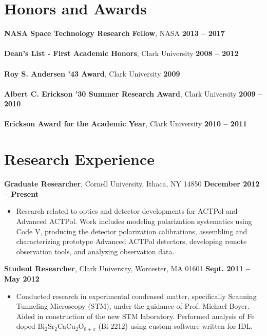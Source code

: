 \documentclass[margin,line]{res}
\begin{document}
\begin{resume}
\section{\sc Honors and Awards}  %
\textbf{NASA Space Technology Research Fellow}, NASA \hfill \textbf{2013 -- 2017}\\
\\
\textbf{Dean's List - First Academic Honors}, Clark University \hfill \textbf{2008 -- 2012}\\ 
\\
\textbf{Roy S. Andersen '43 Award}, Clark University \hfill \textbf{2009}\\ 
\\
\textbf{Albert C. Erickson '30 Summer Research Award}, Clark University \hfill \textbf{2009 -- 2010}\\ 
\\
\textbf{Erickson Award for the Academic Year}, Clark University \hfill \textbf{2010 -- 2011}\\ 

\section{\sc Research Experience}      
    \textbf{Graduate Researcher}, Cornell University, Ithaca, NY 14850 \hfill \textbf{December 2012 -- Present}
    \vspace*{1mm}
    \begin{itemize}
        \item [ ] Research related to optics and detector developments for ACTPol and
                  Advanced ACTPol. Work includes modeling polarization
                  systematics using Code V, producing the detector polarization calibrations,
                  assembling and characterizing prototype Advanced ACTPol detectors, developing remote
                  observation tools, and analyzing observation data.
    \end{itemize} 

    \textbf{Student Researcher}, Clark University, Worcester, MA 01601 \hfill \textbf{Sept. 2011 -- May 2012}
    \vspace*{1mm}
    \begin{itemize}
        \item [ ] Conducted research in experimental condensed matter, specifically
        Scanning Tunneling Microscopy (STM), under the guidance of Prof. Michael Boyer.
        Aided in construction of the new STM laboratory. Performed analysis of Fe doped
        Bi$_2$Sr$_2$CaCu$_2$O$_{8+x}$ (Bi-2212) using custom software written for IDL.
    \end{itemize} 


\end{resume}
\end{document}
